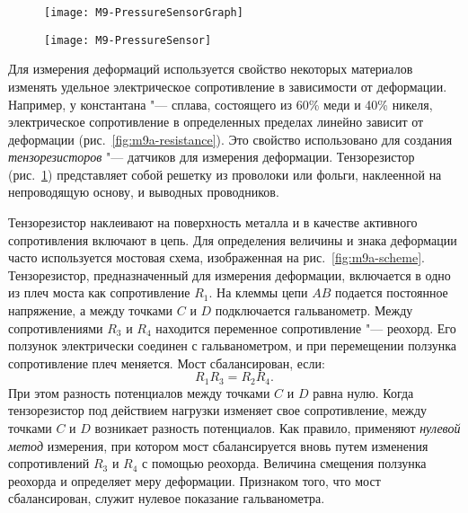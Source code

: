 \documentclass[a4paper, 12pt]{extarticle}
\begin{document}
\begin{figure}[h]
\centering
\begin{minipage}[b]{0.45\linewidth}
\centering
\texttt{[image: M9-PressureSensorGraph]}
\caption{\label{fig:m9a-resistance}}
\end{minipage} \hfill
\begin{minipage}[b]{0.45\linewidth}
\centering
\texttt{[image: M9-PressureSensor]}
\caption{\label{fig:m9a-resistive-strain-sensor}}
\end{minipage}
\end{figure}

Для измерения деформаций используется свойство некоторых материалов изменять удельное электрическое сопротивление в зависимости от деформации. Например, у константана "--- сплава, состоящего из 60\% меди и 40\% никеля, электрическое сопротивление в определенных пределах линейно зависит от деформации (рис.~\ref{fig:m9a-resistance}). Это свойство использовано для создания \emph{тензорезисторов} "--- датчиков для измерения деформации. Тензорезистор (рис.~\ref{fig:m9a-resistive-strain-sensor}) представляет собой решетку из проволоки или фольги, наклеенной на непроводящую основу, и выводных проводников. %

Тензорезистор наклеивают на поверхность металла и в качестве активного сопротивления включают в цепь. Для определения величины и знака деформации часто используется мостовая схема, изображенная на рис.~\ref{fig:m9a-scheme}. Тензорезистор, предназначенный для измерения деформации, включается в одно из плеч моста как сопротивление $R_1$. На клеммы цепи $AB$ подается постоянное напряжение, а между точками $C$ и $D$ подключается гальванометр. Между сопротивлениями $R_3$ и $R_4$ находится переменное сопротивление "--- реохорд. Его ползунок электрически соединен с гальванометром, и при перемещении ползунка сопротивление плеч меняется. Мост сбалансирован, если:
\begin{equation}
\label{eq:m9a-resistance}
R_1 R_3 = R_2 R_4.
\end{equation}
При этом разность потенциалов между точками $C$ и $D$ равна нулю. Когда тензорезистор под действием нагрузки изменяет свое сопротивление, между точками $C$ и $D$ возникает разность потенциалов. Как правило, применяют \emph{нулевой метод} измерения, при котором мост сбалансируется вновь путем изменения сопротивлений $R_3$ и $R_4$ с помощью реохорда. Величина смещения ползунка реохорда и определяет меру деформации. Признаком того, что мост сбалансирован, служит нулевое показание гальванометра.
\end{document}
